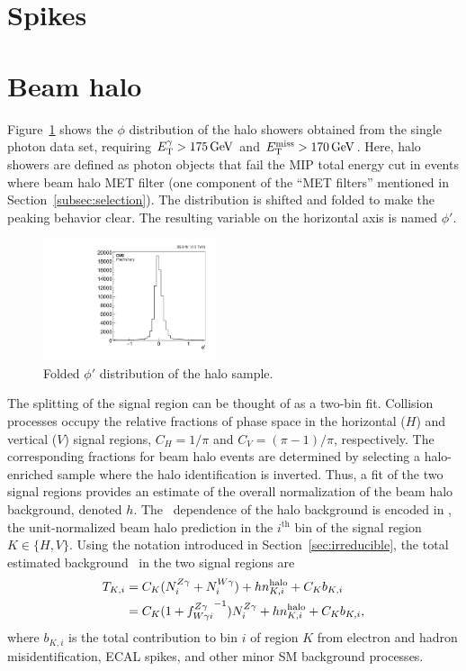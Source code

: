 \section{Spikes}
\label{sec:spikes}

\section{Beam halo}
\label{sec:beam_halo}

Figure~\ref{fig:halophi} shows the $\phi$ distribution of the halo showers obtained from the single photon data set, requiring $\ETg > 175\GeV$ and $\met > 170\GeV$. 
Here, halo showers are defined as photon objects that fail the MIP total energy cut in events where beam halo MET filter (one component of the ``MET filters'' mentioned in Section~\ref{subsec:selection}). 
The distribution is shifted and folded to make the peaking behavior clear. 
The resulting variable on the horizontal axis is named $\phi'$.

\begin{figure}[tbp]
  \begin{center}
    \includegraphics[width=0.45\textwidth]{Analysis/Figures/haloPhiFolded.pdf}
    \caption{
      Folded $\phi'$ distribution of the halo sample.
    }
    \label{fig:halophi}
  \end{center}
\end{figure}

The splitting of the signal region can be thought of as a two-bin fit. 
Collision processes occupy the relative fractions of phase space in the horizontal ($H$) and vertical ($V$) signal regions, $C_{H} = 1/\pi$ and $C_{V} = (\pi-1)/\pi$, respectively. 
The corresponding fractions for beam halo events are determined by selecting a halo-enriched sample where the halo identification is inverted. 
Thus, a fit of the two signal regions provides an estimate of the overall normalization of the beam halo background, denoted $h$. 
The \ETg\ dependence of the halo background is encoded in \nhalo[,i], the unit-normalized beam halo prediction in the $i^\mathrm{th}$ bin of the signal region $K \in \{H,V\}$.
Using the notation introduced in Section~\ref{sec:irreducible}, the total estimated background \TK\ in the two signal regions are
\begin{equation}
\begin{aligned}
  \TK[,i] & = C_{K} (\NZg[i] + \NWg[i]) + h \nhalo[,i] + C_{K} b_{K,i} \\
          & = C_{K} (1 + {\fZW[i]}^{-1}) \NZg[i] + h \nhalo[,i] + C_{K} b_{K,i},
\end{aligned}
\end{equation}
where $b_{K,i}$ is the total contribution to bin $i$ of region $K$ from electron and hadron misidentification, ECAL spikes, and other minor SM background processes.

